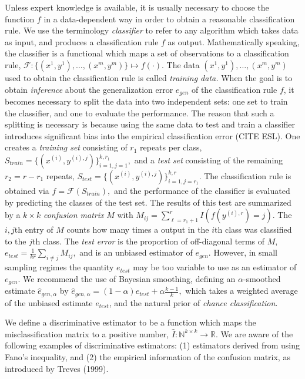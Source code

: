 \documentclass{article}
\begin{document}
Unless expert knowledge is available, it is usually necessary to choose the function $f$ in a
data-dependent way in order to obtain a reasonable classification
rule.  We use the terminology \emph{classifier} to refer to any algorithm which takes
data as input, and produces a classification rule $f$ as output.
Mathematically speaking, the classifier
is a functional which maps a set of observations to a classification
rule,
$
\mathcal{F}: \{(x^{1},y^{1}),\hdots, (x^{m}, y^{m})\} \mapsto f(\cdot).
$
The data $(x^1,y^1),\hdots, (x^m, y^m)$ used to obtain the
classification rule is called \emph{training data.}  When the goal is to
obtain \emph{inference} about the generalization error $e_{gen}$ of the classification
rule $f$, it becomes necessary to split the data into two independent sets:
one set to train the classifier, and one to evaluate the performance.
The reason that such a splitting is necessary is because using the
same data to test and train a classifier introduces significant bias
into the empirical classification error (CITE ESL).
One creates a \emph{training
set} consisting of $r_1$ repeats per class,
$
S_{train} = \{(x^{(i)}, y^{(i),j})\}_{i=1, j=1}^{k, r_1},
$
and a \emph{test set} consisting of the remaining $r_2 = r - r_1$ repeats,
$
S_{test} = \{(x^{(i)}, y^{(i),j})\}_{i=1, j=r_1}^{k, r}.
$
The classification rule is obtained via
$
f = \mathcal{F}(S_{train}),
$
and the performance of the classifier is evaluated by predicting the classes of the test set.
The results of this test are summarized by a $k \times k$ \emph{confusion matrix} $M$ with
$
M_{ij} = \sum_{\ell=r_1 + 1}^r I(f(y^{(i), r}) = j).
$
The $i, j$th entry of $M$ counts how many times a output in the $i$th class was classified  to the $j$th class.
The \emph{test error} is the proportion of off-diagonal terms of $M$,
$
e_{test} = \frac{1}{kr} \sum_{i \neq j} M_{ij},
$
and is an unbiased estimator of $e_{gen}$.
However, in small sampling regimes the quantity $e_{test}$ may be too variable to use as an estimator of $e_{gen}$.  We recommend the use of Bayesian smoothing, defining an  $\alpha$-smoothed estimate $\hat{e}_{gen, \alpha}$ by
$
\hat{e}_{gen, \alpha} = (1 - \alpha) e_{test} + \alpha \frac{k-1}{k},
$
which takes a weighted average of the unbiased estimate $e_{test}$, and the natural prior of \emph{chance classification}.

We define a discriminative estimator to be a function which maps the misclassification matrix to a positive number,
$
\hat{I}: \mathbb{N}^{k \times k} \to \mathbb{R}.
$
We are aware of the following examples of discriminative estimators: (1) estimators derived from using Fano's inequality, and (2) the empirical information of the confusion matrix, as introduced by Treves (1999).
\end{document}
